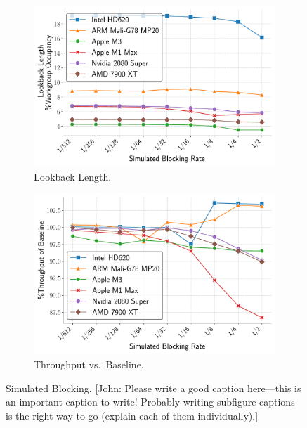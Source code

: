 \documentclass[sigconf]{acmart}
\newcommand{\john}[1]{{\footnotesize\color{cyan}[John: #1]}}
\begin{document}
\begin{figure}
  \vspace{0.2em}

  \begin{subfigure}[t]{0.48\linewidth}
    \centering
    \includegraphics[width=\linewidth]{graphics/lookbackLength_plot.pdf}
    \caption{Lookback Length.\label{fig:lookback_length}}
  \end{subfigure}\hfill
  \begin{subfigure}[t]{0.48\linewidth}
    \centering
    \includegraphics[width=\linewidth]{graphics/time_plot.pdf}
    \caption{Throughput vs.\ Baseline.\label{fig:execution_time}}
  \end{subfigure}

  \caption{Simulated Blocking. \john{Please write a good caption here---this is an important caption to write! Probably writing subfigure captions is the right way to go (explain each of them individually).}\label{fig:vertical_images}}
\end{figure}
\end{document}
